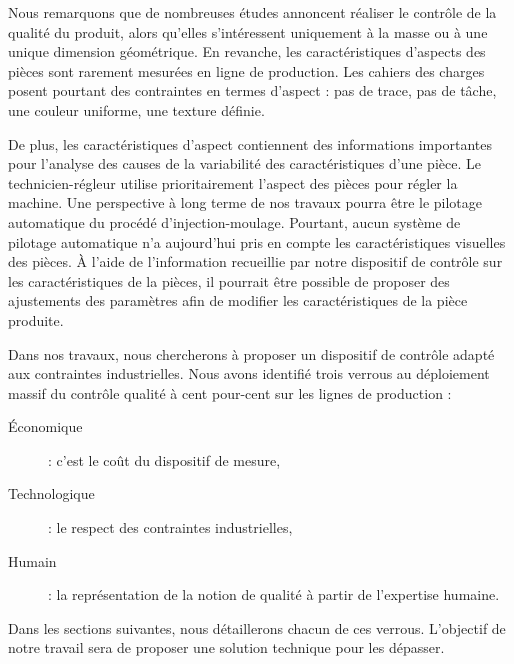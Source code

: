 Nous remarquons que de nombreuses études annoncent réaliser le contrôle de la qualité du produit, alors qu'elles s'intéressent uniquement à la masse ou à une unique dimension géométrique.
En revanche, les caractéristiques d'aspects des pièces sont rarement mesurées en ligne de production.
Les cahiers des charges posent pourtant des contraintes en termes d'aspect : pas de trace, pas de tâche, une couleur uniforme, une texture définie.

De plus, les caractéristiques d'aspect contiennent des informations importantes pour l'analyse des causes de la variabilité des caractéristiques d'une pièce. %
Le technicien-régleur utilise prioritairement l'aspect des pièces pour régler la machine.
Une perspective à long terme de nos travaux pourra être le pilotage automatique du procédé d'injection-moulage.
Pourtant, aucun système de pilotage automatique n'a aujourd'hui pris en compte les caractéristiques visuelles des pièces.
À l'aide de l'information recueillie par notre dispositif de contrôle sur les caractéristiques de la pièces, il pourrait être possible de proposer des ajustements des paramètres afin de modifier les caractéristiques de la pièce produite.



Dans nos travaux, nous chercherons à proposer un dispositif de contrôle adapté aux contraintes industrielles.
Nous avons identifié trois verrous au déploiement massif du contrôle qualité à cent pour-cent sur les lignes de production :
\begin{description}
	\item[Économique] : c’est le coût du dispositif de mesure,
	\item[Technologique] : le respect des contraintes industrielles,
	\item[Humain] : la représentation de la notion de qualité à partir de l'expertise humaine.
\end{description}
Dans les sections suivantes, nous détaillerons chacun de ces verrous.
L'objectif de notre travail sera de proposer une solution technique pour les dépasser.

